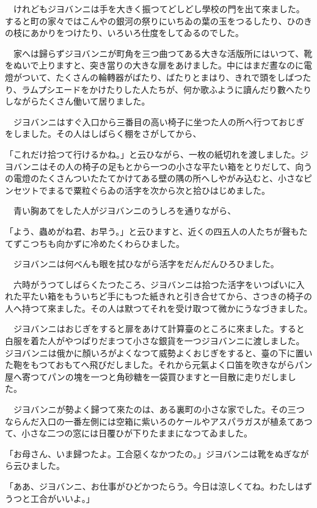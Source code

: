 \documentclass[tate,paper=b6j,jafontsize=9pt]{jlreq}
\begin{document}
　けれどもジヨバンニは手を大きく振つてどしどし學校の門を出て來ました。すると町の家々ではこんやの銀河の祭りにいちゐの葉の玉をつるしたり、ひのきの枝にあかりをつけたり、いろいろ仕度をしてゐるのでした。

　家へは歸らずジヨバンニが町角を三つ曲つてある大きな活版所にはいつて、靴をぬいで上りますと、突き當りの大きな扉をあけました。中にはまだ晝なのに電燈がついて、たくさんの輪轉器がばたり、ばたりとまはり、きれで頭をしばつたり、ラムプシエードをかけたりした人たちが、何か歌ふように讀んだり數へたりしながらたくさん働いて居りました。

　ジヨバンニはすぐ入口から三番目の高い椅子に坐つた人の所へ行つておじぎをしました。その人はしばらく棚をさがしてから、

「これだけ拾つて行けるかね。」と云ひながら、一枚の紙切れを渡しました。ジヨバンニはその人の椅子の足もとから一つの小さな平たい箱をとりだして、向うの電燈のたくさんついたたてかけてある壁の隅の所へしやがみ込むと、小さなピンセツトでまるで粟粒ぐらゐの活字を次から次と拾ひはじめました。

　青い胸あてをした人がジヨバンニのうしろを通りながら、

「よう、蟲めがね君、お早う。」と云ひますと、近くの四五人の人たちが聲もたてずこつちも向かずに冷めたくわらひました。

　ジヨバンニは何べんも眼を拭ひながら活字をだんだんひろひました。

　六時がうつてしばらくたつたころ、ジヨバンニは拾つた活字をいつぱいに入れた平たい箱をもういちど手にもつた紙きれと引き合せてから、さつきの椅子の人へ持つて來ました。その人は默つてそれを受け取つて微かにうなづきました。

　ジヨバンニはおじぎをすると扉をあけて計算臺のところに來ました。すると白服を着た人がやつぱりだまつて小さな銀貨を一つジヨバンニに渡しました。ジヨバンニは俄かに顏いろがよくなつて威勢よくおじぎをすると、臺の下に置いた鞄をもつておもてへ飛びだしました。それから元氣よく口笛を吹きながらパン屋へ寄つてパンの塊を一つと角砂糖を一袋買ひますと一目散に走りだしました。



　ジヨバンニが勢よく歸つて來たのは、ある裏町の小さな家でした。その三つならんだ入口の一番左側には空箱に紫いろのケールやアスパラガスが植ゑてあつて、小さな二つの窓には日覆ひが下りたままになつてゐました。

「お母さん、いま歸つたよ。工合惡くなかつたの。」ジヨバンニは靴をぬぎながら云ひました。

「ああ、ジヨバンニ、お仕事がひどかつたらう。今日は涼しくてね。わたしはずうつと工合がいいよ。」
\end{document}
